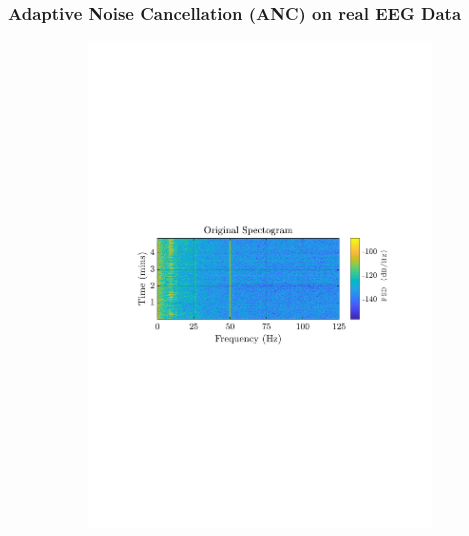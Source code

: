 \documentclass[12pt]{article}
\begin{document}
		\subsubsection{Adaptive Noise Cancellation (ANC) on real EEG Data}
			\begin{figure}[H]
				\centering
				\begin{subfigure}{0.49\textwidth}
					\centering
					\includegraphics[trim={2.2cm 11.2cm 2.70cm  11.2cm}, clip, width=\textwidth]{../MATLAB/figures/q2_3d_fig01.pdf} 
					\captionsetup{justification=centering}
				\end{subfigure}
				\begin{subfigure}{0.49\textwidth}
					\centering

\end{subfigure}
\end{figure}
\end{document}
